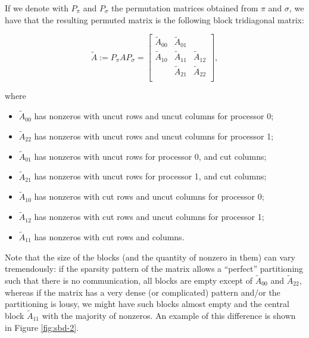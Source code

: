 If we denote with $P_{\pi}$ and $P_{\sigma}$ the permutation matrices obtained from $\pi$ and $\sigma$, we have that the resulting permuted matrix is the following block tridiagonal matrix:

\[ \tilde{A} := P_{\pi} A P_{\sigma} = 
	\begin{bmatrix}
		\tilde{A}_{00} & \tilde{A}_{01}  & \\
		\tilde{A}_{10} & \tilde{A}_{11} & \tilde{A}_{12} \\
		& \tilde{A}_{21} & \tilde{A}_{22} \\ 
	\end{bmatrix},
\]

where

\begin{itemize}
	\item $\tilde{A}_{00}$ has nonzeros with uncut rows and uncut columns for processor 0;
	\item $\tilde{A}_{22}$ has nonzeros with uncut rows and uncut columns for processor 1;
	\item $\tilde{A}_{01}$ has nonzeros with uncut rows for processor 0, and cut columns;
	\item $\tilde{A}_{21}$ has nonzeros with uncut rows for processor 1, and cut columns;
	\item $\tilde{A}_{10}$ has nonzeros with cut rows and uncut columns for processor 0;
	\item $\tilde{A}_{12}$ has nonzeros with cut rows and uncut columns for processor 1;
	\item $\tilde{A}_{11}$ has nonzeros with cut rows and columns.
\end{itemize}

Note that the size of the blocks (and the quantity of nonzero in them) can vary tremendously: if the sparsity pattern of the matrix allows a ``perfect'' partitioning such that there is no communication, all blocks are empty except of $\tilde{A}_{00}$ and $\tilde{A}_{22}$, whereas if the matrix has a very dense (or complicated) pattern and/or the partitioning is lousy, we might have such blocks almost empty and the central block $\tilde{A}_{11}$ with the majority of nonzeros. An example of this difference is shown in Figure \ref{fig:sbd-2}.

